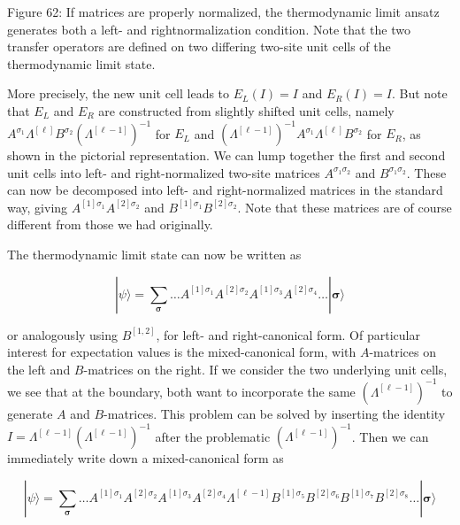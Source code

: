 \documentclass[12pt]{article}
\begin{document}
Figure 62: If matrices are properly normalized, the thermodynamic limit ansatz generates both a left- and rightnormalization condition. Note that the two transfer operators are defined on two differing two-site unit cells of the thermodynamic limit state.

More precisely, the new unit cell leads to $E_{L}(I)=I$ and $E_{R}(I)=I$. But note that $E_{L}$ and $E_{R}$ are constructed from slightly shifted unit cells, namely $A^{\sigma_{1}} \Lambda^{[\ell]} B^{\sigma_{2}}\left(\Lambda^{[\ell-1]}\right)^{-1}$ for $E_{L}$ and $\left(\Lambda^{[\ell-1]}\right)^{-1} A^{\sigma_{1}} \Lambda^{[\ell]} B^{\sigma_{2}}$ for $E_{R}$, as shown in the pictorial representation. We can lump together the first and second unit cells into left- and right-normalized two-site matrices $A^{\sigma_{1} \sigma_{2}}$ and $B^{\sigma_{1} \sigma_{2}}$. These can now be decomposed into left- and right-normalized matrices in the standard way, giving $A^{[1] \sigma_{1}} A^{[2] \sigma_{2}}$ and $B^{[1] \sigma_{1}} B^{[2] \sigma_{2}}$. Note that these matrices are of course different from those we had originally.

The thermodynamic limit state can now be written as


\begin{equation*}
|\psi\rangle=\sum_{\boldsymbol{\sigma}} \ldots A^{[1] \sigma_{1}} A^{[2] \sigma_{2}} A^{[1] \sigma_{3}} A^{[2] \sigma_{4}} \ldots|\boldsymbol{\sigma}\rangle \tag{358}
\end{equation*}


or analogously using $B^{[1,2]}$, for left- and right-canonical form. Of particular interest for expectation values is the mixed-canonical form, with $A$-matrices on the left and $B$-matrices on the right. If we consider the two underlying unit cells, we see that at the boundary, both want to incorporate the same $\left(\Lambda^{[\ell-1]}\right)^{-1}$ to generate $A$ and $B$-matrices. This problem can be solved by inserting the identity $I=\Lambda^{[\ell-1]}\left(\Lambda^{[\ell-1]}\right)^{-1}$ after the problematic $\left(\Lambda^{[\ell-1]}\right)^{-1}$. Then we can immediately write down a mixed-canonical form as


\begin{equation*}
|\psi\rangle=\sum_{\boldsymbol{\sigma}} \ldots A^{[1] \sigma_{1}} A^{[2] \sigma_{2}} A^{[1] \sigma_{3}} A^{[2] \sigma_{4}} \Lambda^{[\ell-1]} B^{[1] \sigma_{5}} B^{[2] \sigma_{6}} B^{[1] \sigma_{7}} B^{[2] \sigma_{8}} \ldots|\boldsymbol{\sigma}\rangle \tag{359}
\end{equation*}
\end{document}
